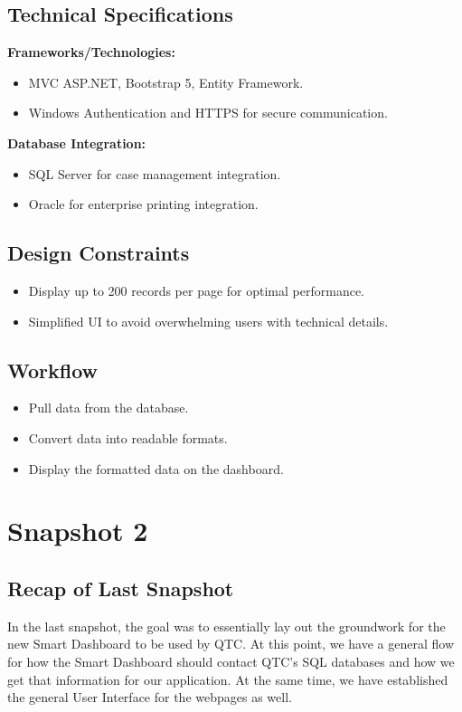 \documentclass[12pt]{article}
\begin{document}
\subsection*{Technical Specifications}
\textbf{Frameworks/Technologies:}
\begin{itemize}
    \item MVC ASP.NET, Bootstrap 5, Entity Framework.
    \item Windows Authentication and HTTPS for secure communication.
\end{itemize}

\textbf{Database Integration:}
\begin{itemize}
    \item SQL Server for case management integration.
    \item Oracle for enterprise printing integration.
\end{itemize}

\subsection*{Design Constraints}
\begin{itemize}
    \item Display up to 200 records per page for optimal performance.
    \item Simplified UI to avoid overwhelming users with technical details.
\end{itemize}

\subsection*{Workflow}
\begin{itemize}
    \item Pull data from the database.
    \item Convert data into readable formats.
    \item Display the formatted data on the dashboard.
\end{itemize}

\section{Snapshot 2}
\subsection{Recap of Last Snapshot}
In the last snapshot, the goal was to essentially lay out the groundwork for the new Smart Dashboard to be used by QTC. At this point, we have a general flow for how the Smart Dashboard should contact QTC’s SQL databases and how we get that information for our application. At the same time, we have established the general User Interface for the webpages as well.
\end{document}
